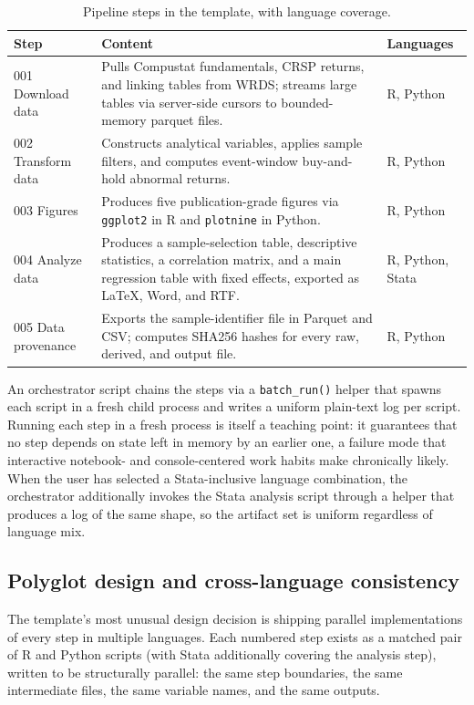 \documentclass[12pt]{article}
\begin{document}
\begin{table}[htbp]
\centering
\caption{Pipeline steps in the template, with language coverage.}
\label{tab:pipeline}
\small
\begin{tabularx}{\textwidth}{@{}lXl@{}}
\toprule
\textbf{Step} & \textbf{Content} & \textbf{Languages} \\
\midrule
001 Download data & Pulls Compustat fundamentals, CRSP returns, and
linking tables from WRDS; streams large tables via server-side cursors to
bounded-memory parquet files. & R, Python \\
002 Transform data & Constructs analytical variables, applies sample
filters, and computes event-window buy-and-hold abnormal returns. & R,
Python \\
003 Figures & Produces five publication-grade figures via
\texttt{ggplot2} \citep{ggplot2} in R and \texttt{plotnine}
\citep{plotnine} in Python. & R, Python \\
004 Analyze data & Produces a sample-selection table, descriptive
statistics, a correlation matrix, and a main regression table with fixed
effects, exported as \LaTeX{}, Word, and RTF. & R, Python, Stata \\
005 Data provenance & Exports the sample-identifier file in Parquet and
CSV; computes SHA256 hashes for every raw, derived, and output file. & R,
Python \\
\bottomrule
\end{tabularx}
\end{table}

An orchestrator script chains the steps via a \texttt{batch\_run()}
helper that spawns each script in a fresh child process and writes a
uniform plain-text log per script. Running each step in a fresh process
is itself a teaching point: it guarantees that no step depends on state
left in memory by an earlier one, a failure mode that interactive
notebook- and console-centered work habits make chronically likely. When
the user has selected a Stata-inclusive language combination, the
orchestrator additionally invokes the Stata analysis script through a
helper that produces a log of the same shape, so the artifact set is
uniform regardless of language mix.

\subsection{Polyglot design and cross-language consistency}

The template's most unusual design decision is shipping parallel
implementations of every step in multiple languages. Each numbered step
exists as a matched pair of R and Python scripts (with Stata additionally
covering the analysis step), written to be structurally parallel: the
same step boundaries, the same intermediate files, the same variable
names, and the same outputs.
\end{document}
